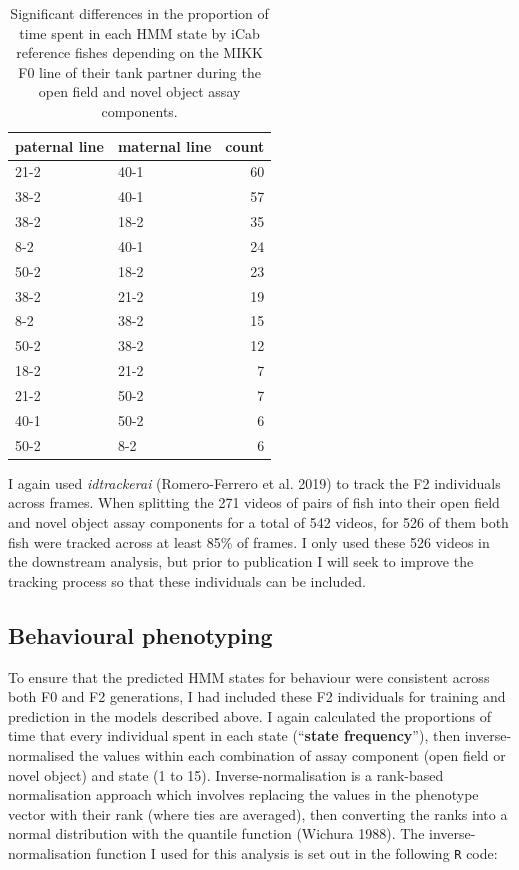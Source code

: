 \documentclass[
]{book}
\newcommand{\passthrough}[1]{#1}
\begin{document}
\begin{table}

\caption{\label{tab:F2-cross-counts}Significant differences in the proportion of time spent in each HMM state by iCab reference fishes depending on the MIKK F0 line of their tank partner during the open field and novel object assay components.}
\centering
\begin{tabular}[t]{l|l|r}
\hline
paternal line & maternal line & count\\
\hline
21-2 & 40-1 & 60\\
\hline
38-2 & 40-1 & 57\\
\hline
38-2 & 18-2 & 35\\
\hline
8-2 & 40-1 & 24\\
\hline
50-2 & 18-2 & 23\\
\hline
38-2 & 21-2 & 19\\
\hline
8-2 & 38-2 & 15\\
\hline
50-2 & 38-2 & 12\\
\hline
18-2 & 21-2 & 7\\
\hline
21-2 & 50-2 & 7\\
\hline
40-1 & 50-2 & 6\\
\hline
50-2 & 8-2 & 6\\
\hline
\end{tabular}
\end{table}

I again used \emph{idtrackerai} (Romero-Ferrero et al. 2019) to track the F2 individuals across frames. When splitting the 271 videos of pairs of fish into their open field and novel object assay components for a total of 542 videos, for 526 of them both fish were tracked across at least 85\% of frames. I only used these 526 videos in the downstream analysis, but prior to publication I will seek to improve the tracking process so that these individuals can be included.

\hypertarget{behavioural-phenotyping}{%
\subsection{Behavioural phenotyping}\label{behavioural-phenotyping}}

To ensure that the predicted HMM states for behaviour were consistent across both F0 and F2 generations, I had included these F2 individuals for training and prediction in the models described above. I again calculated the proportions of time that every individual spent in each state (``\textbf{state frequency}''), then inverse-normalised the values within each combination of assay component (open field or novel object) and state (1 to 15). Inverse-normalisation is a rank-based normalisation approach which involves replacing the values in the phenotype vector with their rank (where ties are averaged), then converting the ranks into a normal distribution with the quantile function (Wichura 1988). The inverse-normalisation function I used for this analysis is set out in the following \passthrough{\lstinline!R!} code:
\end{document}
